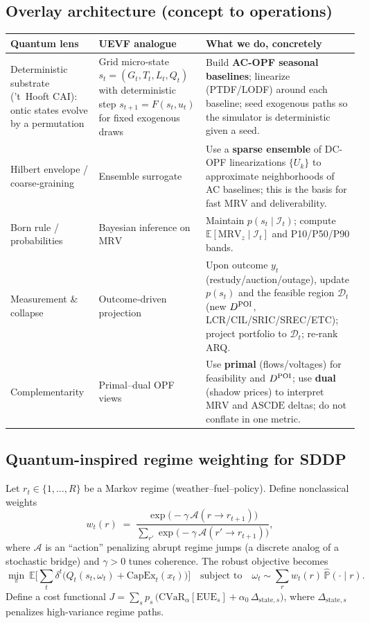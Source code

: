 \documentclass[11pt]{article}
\newcommand{\ASCDE}{\ensuremath{\mathrm{ASCDE}}}
\newcommand{\MRV}{\ensuremath{\mathrm{MRV}}}
\newcommand{\E}{\mathbb{E}}
\numberwithin{equation}{section}
\theoremstyle{definition}
\theoremstyle{remark}
\begin{document}
\subsection{Overlay architecture (concept to operations)}
\renewcommand{\arraystretch}{1.2}
\begin{tabularx}{\textwidth}{>{\raggedright\arraybackslash}p{} >{\raggedright\arraybackslash}p{} X}
\toprule
\textbf{Quantum lens} & \textbf{UEVF analogue} & \textbf{What we do, concretely} \\
\midrule
Deterministic substrate (’t~Hooft CAI): ontic states evolve by a permutation
&
Grid micro‑state \(s_t=(G_t,T_t,L_t,Q_t)\) with deterministic step \(s_{t+1}=F(s_t,u_t)\) for fixed exogenous draws
&
Build \textbf{AC-OPF seasonal baselines}; linearize (PTDF/LODF) around each baseline; seed exogenous paths so the simulator is deterministic given a seed.\\
\addlinespace
Hilbert envelope / coarse‑graining
&
Ensemble surrogate
&
Use a \textbf{sparse ensemble} of DC-OPF linearizations \(\{U_k\}\) to approximate neighborhoods of AC baselines; this is the basis for fast \(\MRV\) and deliverability.\\
\addlinespace
Born rule / probabilities
&
Bayesian inference on \(\MRV\)
&
Maintain \(p(s_t\!\mid\!\mathcal I_t)\); compute \(\mathbb{E}[\MRV_{z}\!\mid\!\mathcal I_t]\) and P10/P50/P90 bands.\\
\addlinespace
Measurement \& collapse
&
Outcome‑driven projection
&
Upon outcome \(y_t\) (restudy/auction/outage), update \(p(s_t)\) and the feasible region \(\mathcal D_t\) (new \(\Ddel\), LCR/CIL/SRIC/SREC/ETC); project portfolio to \(\mathcal D_t\); re‑rank ARQ.\\
\addlinespace
Complementarity
&
Primal–dual OPF views
&
Use \textbf{primal} (flows/voltages) for feasibility and \(\Ddel\); use \textbf{dual} (shadow prices) to interpret \(\MRV\) and \ASCDE{} deltas; do not conflate in one metric.\\
\bottomrule
\end{tabularx}

\subsection{Quantum-inspired regime weighting for SDDP}

Let $r_t\in\{1,\dots,R\}$ be a Markov regime (weather–fuel–policy). Define nonclassical weights
\[
w_t(r) \;=\; \frac{\exp\!\big(-\gamma\,\mathcal{A}(r\!\to\!r_{t+1})\big)}{\sum_{r'}\exp\!\big(-\gamma\,\mathcal{A}(r'\!\to\!r_{t+1})\big)},
\]
where $\mathcal{A}$ is an “action” penalizing abrupt regime jumps (a discrete analog of a stochastic bridge) and $\gamma>0$ tunes coherence. The robust objective becomes
\[
\min_{\pi}\ \E\Big[\sum_{t}\delta^t\big(Q_t(s_t,\omega_t)+\mathrm{CapEx}_t(x_t)\big)\Big]
\quad\text{subject to}\quad \omega_t\sim \sum_{r} w_t(r)\,\widehat{\mathbb{P}}(\cdot\mid r).
\]
Define a cost functional $J=\sum_{s} p_s\,\big(\mathrm{CVaR}_\alpha[\mathrm{EUE}_s] + \alpha_0\,\Delta_{\text{state},s}\big)$,
where $\Delta_{\text{state},s}$ penalizes high-variance regime paths.
\end{document}
